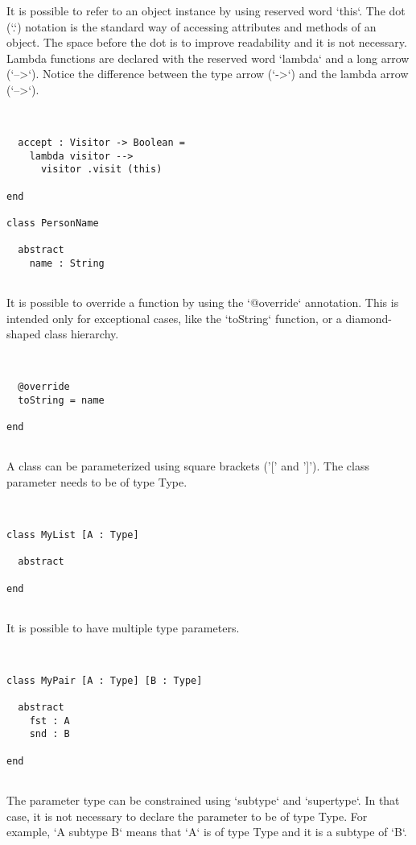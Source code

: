 \documentclass[12pt,a4paper]{article}
\begin{document}
  It is possible to refer to an object instance by using reserved word `this`.
   The dot (`.`) notation is the standard way of accessing attributes and methods of an
   object. The space before the dot is to improve readability and it is not necessary.
   Lambda functions are declared with the reserved word `lambda` and a long arrow (`-->`).
   Notice the difference between the type arrow (`->`) and the lambda arrow (`-->`).


\begin{lstlisting}


  accept : Visitor -> Boolean =
    lambda visitor -->
      visitor .visit (this)

end

class PersonName

  abstract
    name : String


\end{lstlisting}

  It is possible to override a function by using the `@override` annotation.
   This is intended only for exceptional cases, like the `toString` function, or a
   diamond-shaped class hierarchy.


\begin{lstlisting}


  @override
  toString = name

end


\end{lstlisting}

A class can be parameterized using square brackets ('[' and ']').
 The class parameter needs to be of type Type.


\begin{lstlisting}


class MyList [A : Type]

  abstract

end


\end{lstlisting}

It is possible to have multiple type parameters.


\begin{lstlisting}


class MyPair [A : Type] [B : Type]

  abstract
    fst : A
    snd : B

end


\end{lstlisting}

The parameter type can be constrained using `subtype` and `supertype`.
 In that case, it is not necessary to declare the parameter to be of type Type.
 For example, `A subtype B` means that `A` is of type Type and it is a subtype of `B`.
\end{document}

